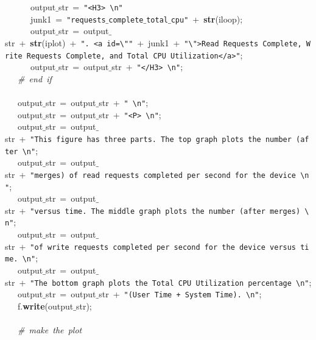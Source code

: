 \mbox{}\ \ \ \ \ \ output$\_$str\ =\ \texttt{"{}\textless{}H3\textgreater{}\ \textbackslash{}n"{}} \\
\mbox{}\ \ \ \ \ \ junk1\ =\ \texttt{"{}requests$\_$complete$\_$total$\_$cpu"{}}\ +\ \textbf{str}(iloop); \\
\mbox{}\ \ \ \ \ \ output$\_$str\ =\ output$\_$str\ +\ \textbf{str}(iplot)\ +\ \texttt{"{}.\ \textless{}a\ id=\textbackslash{}"{}"{}}\ +\ junk1\ +\ \texttt{"{}\textbackslash{}"{}\textgreater{}Read\ Requests\ Complete,\ Write\ Requests\ Complete,\ and\ Total\ CPU\ Utilization\textless{}/a\textgreater{}"{}}; \\
\mbox{}\ \ \ \ \ \ output$\_$str\ =\ output$\_$str\ +\ \texttt{"{}\textless{}/H3\textgreater{}\ \textbackslash{}n"{}}; \\
\mbox{}\ \ \ \textit{\#\ end\ if} \\
\mbox{}\ \ \  \\
\mbox{}\ \ \ output$\_$str\ =\ output$\_$str\ +\ \texttt{"{}\ \textbackslash{}n"{}}; \\
\mbox{}\ \ \ output$\_$str\ =\ output$\_$str\ +\ \texttt{"{}\textless{}P\textgreater{}\ \textbackslash{}n"{}}; \\
\mbox{}\ \ \ output$\_$str\ =\ output$\_$str\ +\ \texttt{"{}This\ figure\ has\ three\ parts.\ The\ top\ graph\ plots\ the\ number\ (after\ \textbackslash{}n"{}}; \\
\mbox{}\ \ \ output$\_$str\ =\ output$\_$str\ +\ \texttt{"{}merges)\ of\ read\ requests\ completed\ per\ second\ for\ the\ device\ \textbackslash{}n"{}}; \\
\mbox{}\ \ \ output$\_$str\ =\ output$\_$str\ +\ \texttt{"{}versus\ time.\ The\ middle\ graph\ plots\ the\ number\ (after\ merges)\ \textbackslash{}n"{}}; \\
\mbox{}\ \ \ output$\_$str\ =\ output$\_$str\ +\ \texttt{"{}of\ write\ requests\ completed\ per\ second\ for\ the\ device\ versus\ time.\ \textbackslash{}n"{}}; \\
\mbox{}\ \ \ output$\_$str\ =\ output$\_$str\ +\ \texttt{"{}The\ bottom\ graph\ plots\ the\ Total\ CPU\ Utilization\ percentage\ \textbackslash{}n"{}}; \\
\mbox{}\ \ \ output$\_$str\ =\ output$\_$str\ +\ \texttt{"{}(User\ Time\ +\ System\ Time).\ \textbackslash{}n"{}}; \\
\mbox{}\ \ \ f.\textbf{write}(output$\_$str); \\
\mbox{}\ \ \  \\
\mbox{}\ \ \ \textit{\#\ make\ the\ plot} \\

